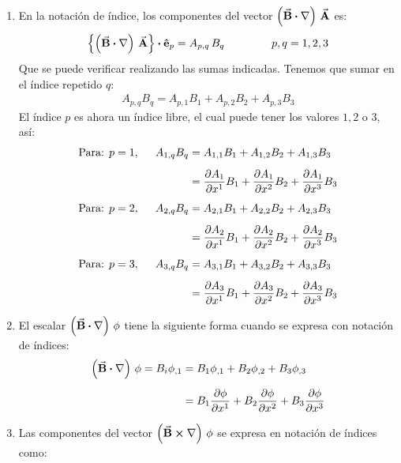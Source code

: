 \documentclass[hidelinks,12pt]{article}
\begin{document}
\begin{enumerate}
\item En la notación de índice, los componentes del vector $\left( \va{B} \vdot \nabla \right) \, \va{A}$ es:
\begin{align*}
\left\{ \left( \va{B} \vdot \nabla \right) \, \va{A} \right\} \vdot \vu{e}_{p} = A_{p,q} \, B_{q} \hspace{1.5cm} p, q = 1, 2, 3
\end{align*}
Que se puede verificar realizando las sumas indicadas. Tenemos que sumar en el índice repetido $q$:
\begin{align*}
A_{p,q} B_{q} = A_{p,1} B_{1} + A_{p,2} B_{2} + A_{p,3} B_{3}
\end{align*}
El índice $p$ es ahora un índice libre, el cual puede tener los valores $1, 2$ o $3$, así:
\begin{align*}
\text{Para: } p = 1, \hspace{0.5cm} A_{1, q} B_{q} &= A_{1,1} B_{1} + A_{1,2} B_{2} + A_{1,3} B_{3} \\[0.5em]
&=\pdv{A_{1}}{x^{1}} B_{1} + \pdv{A_{1}}{x^{2}} B_{2} + \pdv{A_{1}}{x^{3}} B_{3} \\[0.5em]
\text{Para: } p = 2, \hspace{0.5cm} A_{2, q} B_{q} &= A_{2,1} B_{1} + A_{2,2} B_{2} + A_{2,3} B_{3} \\[0.5em]
&=\pdv{A_{2}}{x^{1}} B_{1} + \pdv{A_{2}}{x^{2}} B_{2} + \pdv{A_{2}}{x^{3}} B_{3} \\[0.5em]
\text{Para: } p = 3, \hspace{0.5cm} A_{3, q} B_{q} &= A_{3,1} B_{1} + A_{3,2} B_{2} + A_{3,3} B_{3} \\[0.5em]
&=\pdv{A_{3}}{x^{1}} B_{1} + \pdv{A_{3}}{x^{2}} B_{2} + \pdv{A_{3}}{x^{3}} B_{3}
\end{align*}
\item El escalar $\left( \va{B} \vdot \nabla \right) \, \phi$ tiene la siguiente forma cuando se expresa con notación de índices:
\begin{align*}
\left( \va{B} \vdot \nabla \right) \, \phi = B_{i} \phi_{,1} &= B_{1} \phi_{,1} + B_{2} \phi_{,2} + B_{3} \phi_{,3} \\[0.5em]
&= B_{1} \pdv{\phi}{x^{1}} + B_{2} \pdv{\phi}{x^{2}} + B_{3} \pdv{\phi}{x^{3}}
\end{align*}
\item Las componentes del vector $\left( \va{B} \cross \nabla \right) \, \phi$ se expresa en notación de índices como:
\begin{align*}

\end{align*}
\end{enumerate}
\end{document}
